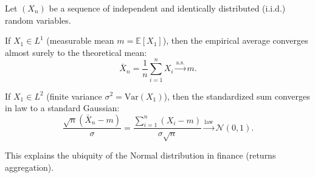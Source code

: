 Let $(X_n)$ be a sequence of independent and identically distributed (i.i.d.) random variables.

\begin{theorem}
If $X_1 \in L^1$ (measurable mean $m = \mathbb{E}[X_1]$), then the empirical average converges almost surely to the theoretical mean:
\[
\bar{X}_n = \frac{1}{n} \sum_{i=1}^n X_i \xrightarrow{\text{a.s.}} m.
\]
\end{theorem}

\begin{theorem}
If $X_1 \in L^2$ (finite variance $\sigma^2 = \text{Var}(X_1)$), then the standardized sum converges in law to a standard Gaussian:
\[
\frac{\sqrt{n}(\bar{X}_n - m)}{\sigma} = \frac{\sum_{i=1}^n (X_i - m)}{\sigma \sqrt{n}} \xrightarrow{\text{law}} \mathcal{N}(0, 1).
\]
\end{theorem}
This explains the ubiquity of the Normal distribution in finance (returns aggregation).
